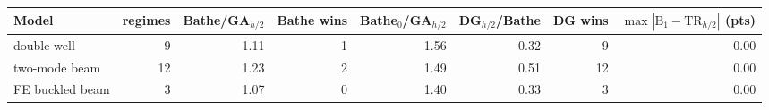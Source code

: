 \begin{tabular}{lrrrrrrr}\toprule
Model & regimes & Bathe/GA$_{h/2}$ & Bathe wins & Bathe$_0$/GA$_{h/2}$ & DG$_{h/2}$/Bathe & DG wins & $\max|\mathrm{B}_1-\mathrm{TR}_{h/2}|$ (pts) \\\midrule
double well & 9 & 1.11 & 1 & 1.56 & 0.32 & 9 & 0.00 \\
two-mode beam & 12 & 1.23 & 2 & 1.49 & 0.51 & 12 & 0.00 \\
FE buckled beam & 3 & 1.07 & 0 & 1.40 & 0.33 & 3 & 0.00 \\
\bottomrule\end{tabular}
